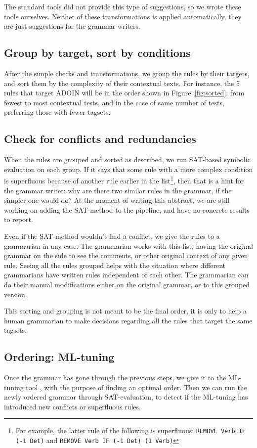 \documentclass[11pt]{article}
\begin{document}
The standard tools did not provide this type of suggestions, so we wrote these tools ourselves. Neither of these transformations is applied automatically, they are just suggestions for the grammar writers.



\subsection{Group by target, sort by conditions}
After the simple checks and transformations, we group the rules by their targets, and sort them by the complexity of their contextual texts. For instance, the 5 rules that target ADOIN will be in the order shown in Figure~\ref{fig:sorted}: from fewest to most contextual tests, and in the case of same number of tests, preferring those with fewer tagsets.


\subsection{Check for conflicts and redundancies}

When the rules are grouped and sorted as described, we run SAT-based 
symbolic evaluation \cite{listenmaa_claessen2016} on each group. 
If it says that some rule with a more complex condition is superfluous 
because of another rule earlier in the list\footnote{For example, the latter rule of the following is superfluous: \texttt{REMOVE Verb IF (-1 Det)} and \texttt{REMOVE Verb IF (-1 Det) (1 Verb)}}, 
then that is a hint for the grammar writer: why are there two similar 
rules in the grammar, if the simpler one would do?
At the moment of writing this abstract, we are still working on adding
the SAT-method to the pipeline, and have no concrete results to report.

Even if the SAT-method wouldn't find a conflict, we give the rules to 
a grammarian in any case. The grammarian works with this list, having 
the original grammar on the side to see the comments, or other original 
context of any given rule. Seeing all the rules grouped helps with the 
situation where different grammarians have written rules independent of 
each other. The grammarian can do their manual modifications either on 
the original grammar, or to this grouped version.

This sorting and grouping is not meant to be the final order, it is only 
to help a human grammarian to make decisions regarding all the rules that 
target the same tagsets.

\subsection{Ordering: ML-tuning}
Once the grammar has gone through the previous steps, we give it to the 
ML-tuning tool \cite{bick2013tuning}, with the purpose of finding an 
optimal order. Then we can run the newly ordered grammar through SAT-evaluation,
to detect if the ML-tuning has introduced new conflicts or superfluous rules.
\end{document}

